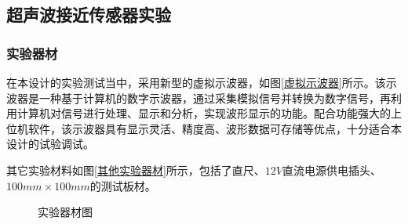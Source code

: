 \subsection{超声波接近传感器实验}

\subsubsection{实验器材}
在本设计的实验测试当中，采用新型的虚拟示波器，如图\ref{虚拟示波器}所示。该示波器是一种基于计算机的数字示波器，通过采集模拟信号并转换为数字信号，再利用计算机对信号进行处理、显示和分析，实现波形显示的功能。配合功能强大的上位机软件，该示波器具有显示灵活、精度高、波形数据可存储等优点，十分适合本设计的试验调试。\par
其它实验材料如图\ref{其他实验器材}所示，包括了直尺、$12V$直流电源供电插头、$100mm\times100mm$的测试板材。

\begin{figure}[ht]
	\centering
	\caption{实验器材图}
	\label{实验器材图}
\end{figure}
